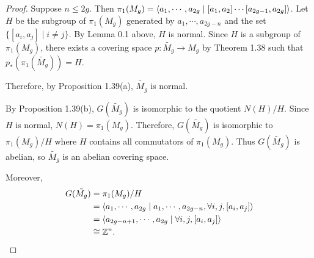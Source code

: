 \documentclass[12pt, psamsfonts]{amsart}
\theoremstyle{definition}
\theoremstyle{remark}
\numberwithin{equation}{section}
\begin{document}
\begin{proof}
  Suppose $n \leq 2g$.
  Then $\pi_1(M_g) = \ev{a_1, \cdots, a_{2g} \mid [a_1, a_2] \cdots [a_{2g - 1}, a_{2g}]}$.
  Let $H$ be the subgroup of $\pi_1(M_g)$ generated by $a_1, \cdots, a_{2g - n}$ and the set $\{ [a_i, a_j] \mid i \ne j \}$.
  By Lemma 0.1 above, $H$ is normal.
  Since $H$ is a subgroup of $\pi_1(M_g)$, there exists a covering space $p: \tilde{M_g} \rightarrow M_g$ by Theorem 1.38 such that $p_*(\pi_1(\tilde{M_g})) = H$.

  Therefore, by Proposition 1.39(a), $\tilde{M_g}$ is normal.

  By Proposition 1.39(b), $G(\tilde{M_g})$ is isomorphic to the quotient $N(H) / H$.
  Since $H$ is normal, $N(H) = \pi_1(M_g)$.
  Therefore, $G(\tilde{M_g})$ is isomorphic to $\pi_1(M_g) / H$ where $H$ contains all commutators of $\pi_1(M_g)$.
  Thus $G(\tilde{M_g})$ is abelian, so $\tilde{M_g}$ is an abelian covering space.

  Moreover,
  \begin{align*}
    G(\tilde{M_g})
      &= \pi_1(M_g) / H \\
      &= \ev{a_1, \cdots, a_{2g} \mid a_1, \cdots, a_{2g - n}, \forall i, j, [a_i, a_j]} \\
      &= \ev{a_{2g - n + 1}, \cdots, a_{2g} \mid \forall i, j, [a_i, a_j]} \\
      &\cong \mathbb{Z}^n.
  \end{align*}




\end{proof}
\end{document}
